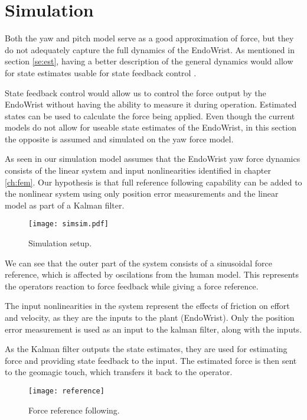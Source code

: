 \section{Simulation}
Both the yaw and pitch model serve as a good approximation of force, but they do not adequately capture the full dynamics of the EndoWrist.
As mentioned in section \ref{se:est}, having a better description of the general dynamics would allow for state estimates usable for state feedback control \cite{yue2004state}.

State feedback control would allow us to control the force output by the EndoWrist without having the ability to measure it during operation.
Estimated states can be used to calculate the force being applied.
Even though the current models do not allow for useable state estimates of the EndoWrist, in this section the opposite is assumed and simulated on the yaw force model.

As seen in  our simulation model assumes that the EndoWrist yaw force dynamics consists of the linear system and input nonlinearities identified in chapter \ref{ch:fem}.
Our hypothesis is that full reference following capability can be added to the nonlinear system using only position error measurements and the linear model as part of a Kalman filter.

\begin{figure}[H]\label{mdle}
\centering
\texttt{[image: simsim.pdf]}
\caption{Simulation setup.}
\end{figure}

We can see that the outer part of the system consists of a sinusoidal force reference, which is affected by oscilations from the human model. 
This represents the operators reaction to force feedback while giving a force reference.

The input nonlinearities in the system represent the effects of friction on effort and velocity, as they are the inputs to the plant (EndoWrist).
Only the position error measurement is used as an input to the kalman filter, along with the inputs.

As the Kalman filter outputs the state estimates, they are used for estimating force and providing state feedback to the input.
The estimated force is then sent to the geomagic touch, which transfers it back to the operator.

\begin{figure}[H]
\centering
\hspace{-2.5em}\texttt{[image: reference]}
\caption{Force reference following.}
\label{fig:freffl}
\end{figure}

